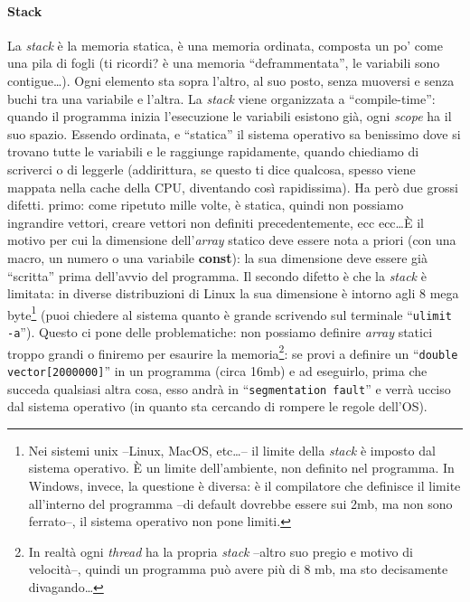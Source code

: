 \begin{small}
 \paragraph{Stack} La \emph{stack} è la memoria statica, è una memoria ordinata, composta un po' come una pila di fogli (ti ricordi? è una memoria ``deframmentata'', le variabili sono contigue\ldots). Ogni elemento sta sopra l'altro, al suo posto, senza muoversi e senza buchi tra una variabile e l'altra. La \emph{stack} viene organizzata a ``compile-time'': quando il programma inizia l'esecuzione le variabili esistono già, ogni \emph{scope} ha il suo spazio. Essendo ordinata, e ``statica'' il sistema operativo sa benissimo dove si trovano tutte le variabili e le raggiunge rapidamente, quando chiediamo di scriverci o di leggerle (addirittura, se questo ti dice qualcosa, spesso viene mappata nella cache della CPU, diventando così rapidissima). Ha però due grossi difetti. primo: come ripetuto mille volte, è statica, quindi non possiamo ingrandire vettori, creare vettori non definiti precedentemente, ecc ecc\ldots È il motivo per cui la dimensione dell'\emph{array} statico deve essere nota a priori (con una macro, un numero o una variabile \textbf{const}): la sua dimensione deve essere già ``scritta'' prima dell'avvio del programma. Il secondo difetto è che la \emph{stack} è limitata: in diverse distribuzioni di Linux la sua dimensione è intorno agli 8 mega byte\footnote{Nei sistemi unix --Linux, MacOS, etc\ldots-- il limite della \emph{stack} è imposto dal sistema operativo. È un limite dell'ambiente, non definito nel programma. In Windows, invece, la questione è diversa: è il compilatore che definisce il limite all'interno del programma --di default dovrebbe essere sui 2mb, ma non sono ferrato--, il sistema operativo non pone limiti. } (puoi chiedere al sistema quanto è grande scrivendo sul terminale ``\verb|ulimit -a|''). Questo ci pone delle problematiche: non possiamo definire \emph{array} statici troppo grandi o finiremo per esaurire la memoria\footnote{In realtà ogni \emph{thread} ha la propria \emph{stack} --altro suo pregio e motivo di velocità--, quindi un programma può avere più di 8 mb, ma sto decisamente divagando\ldots}: se provi a definire un ``\lstinline|double vector[2000000]|'' in un programma (circa 16mb) e ad eseguirlo, prima che succeda qualsiasi altra cosa, esso andrà in ``\verb|segmentation fault|'' e verrà ucciso dal sistema operativo (in quanto sta cercando di rompere le regole dell'OS).
 

\end{small}
